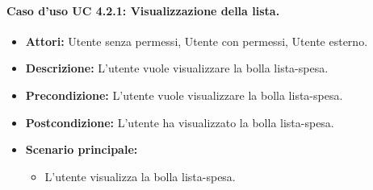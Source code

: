 \paragraph{Caso d'uso UC 4.2.1: Visualizzazione della lista.}
\label{Caso d'uso UC 4.2.1: Visualizzazione della lista.}

\FloatBarrier
\begin{itemize}
\item \textbf{Attori:} Utente senza permessi, Utente con permessi, Utente esterno.
\item \textbf{Descrizione:} L'utente vuole visualizzare la bolla lista-spesa.
\item \textbf{Precondizione:} L'utente vuole visualizzare la bolla lista-spesa. 
\item \textbf{Postcondizione:} L'utente ha visualizzato la bolla lista-spesa.
\item \textbf{Scenario principale:}
	\begin{itemize}
	\item{L'utente visualizza la bolla lista-spesa.}
	\end{itemize}
\end{itemize}